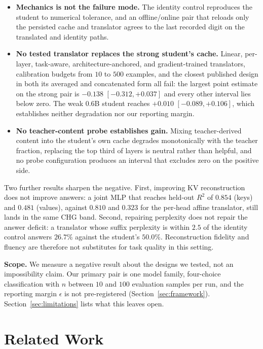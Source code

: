 \documentclass[10pt]{article}
\newcommand{\kv}{\ensuremath{\mathrm{KV}}}
\begin{document}
\begin{itemize}
\item \textbf{Mechanics is not the failure mode.} The identity control
reproduces the student to numerical tolerance, and an offline/online pair that
reloads only the persisted cache and translator agrees to the last recorded
digit on the translated and identity paths.
\item \textbf{No tested translator replaces the strong student's cache.} Linear,
per-layer, task-aware, architecture-anchored, and gradient-trained
translators, calibration budgets from $10$ to $500$ examples, and the closest
published design in both its averaged and concatenated form all fail: the
largest point estimate on the strong pair is $-0.138$ $[-0.312,+0.037]$ and
every other interval lies below zero. The weak $0.6$B student reaches $+0.010$
$[-0.089,+0.106]$, which establishes neither degradation nor our reporting
margin.
\item \textbf{No teacher-content probe establishes gain.} Mixing teacher-derived
content into the student's own cache degrades monotonically with the teacher
fraction, replacing the top third of layers is neutral rather than helpful, and
no probe configuration produces an interval that excludes zero on the positive
side.
\end{itemize}

Two further results sharpen the negative. First, improving \kv{}
reconstruction does not improve answers: a joint MLP that reaches held-out
$R^2$ of $0.854$ (keys) and $0.481$ (values), against $0.810$ and $0.323$ for
the per-head affine translator, still lands in the same CHG band. Second, repairing
perplexity does not repair the answer deficit: a translator whose suffix
perplexity is within $2.5$ of the identity control answers $26.7\%$ against the
student's $50.0\%$. Reconstruction fidelity and fluency are therefore not
substitutes for task quality in this setting.

\textbf{Scope.} We measure a negative result about the designs we tested, not
an impossibility claim. Our primary pair is one model family, four-choice
classification with $n$ between $10$ and $100$ evaluation samples per run, and
the reporting margin $\epsilon$ is not pre-registered
(Section~\ref{sec:framework}). Section~\ref{sec:limitations} lists what this
leaves open.


\section{Related Work}
\label{sec:survey}
\end{document}
